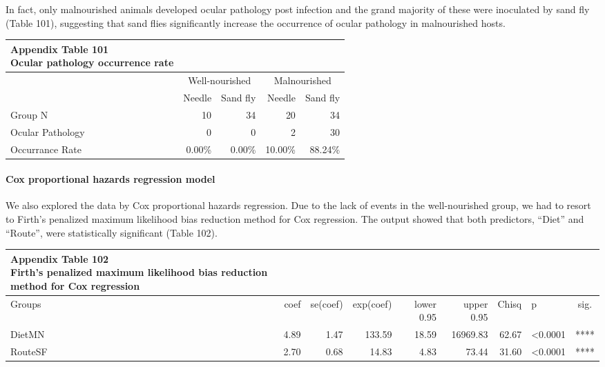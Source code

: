 \documentclass[
  12pt,
  letterpaper,
]{article}
\begin{document}
In fact, only malnourished animals developed ocular pathology post infection and the grand majority of these were inoculated by sand fly (Table 101), suggesting that sand flies significantly increase the occurrence of ocular pathology in malnourished hosts.

\begin{longtable}{l|rrrr}
\caption*{
{\large \textbf{Appendix Table 101}} \\ 
{\small \textbf{Ocular pathology occurrence rate}}
} \\ 
\toprule
\multicolumn{1}{l}{} & \multicolumn{2}{c}{Well-nourished} & \multicolumn{2}{c}{Malnourished} \\ 
\cmidrule(lr){2-3} \cmidrule(lr){4-5}
\multicolumn{1}{l}{} & Needle & Sand fly & Needle & Sand fly \\ 
\midrule\addlinespace[2.5pt]
Group N & 10 & 34 & 20 & 34 \\ 
Ocular Pathology &  0 &  0 &  2 & 30 \\ 
Occurrance Rate &  0.00\% &  0.00\% & 10.00\% & 88.24\% \\ 
\bottomrule
\end{longtable}

\paragraph{Cox proportional hazards regression model}\label{cox-proportional-hazards-regression-model}

We also explored the data by Cox proportional hazards regression. Due to the lack of events in the well-nourished group, we had to resort to Firth's penalized maximum likelihood bias reduction method for Cox regression. The output showed that both predictors, ``Diet'' and ``Route'', were statistically significant (Table 102).

\begin{longtable}{l|rrrrrrlc}
\caption*{
{\large \textbf{Appendix Table 102}} \\ 
{\small \textbf{Firth's penalized maximum likelihood bias reduction method for Cox regression}}
} \\ 
\toprule
\multicolumn{1}{l}{Groups} & coef & se(coef) & exp(coef) & lower 0.95 & upper 0.95 & Chisq & p & sig. \\ 
\midrule\addlinespace[2.5pt]
DietMN & 4.89 & 1.47 & 133.59 & 18.59 & 16969.83 & 62.67 & <0.0001 & **** \\ 
RouteSF & 2.70 & 0.68 & 14.83 & 4.83 & 73.44 & 31.60 & <0.0001 & **** \\ 
\bottomrule
\end{longtable}
\end{document}
